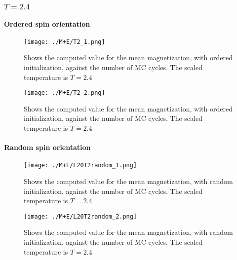 \documentclass[../main.tex]{subfiles}
\begin{document}
\subsubsection*{$T=2.4$}
\paragraph*{Ordered spin orientation}

\begin{figure}[!h]
  \texttt{[image: ./M+E/T2\_1.png]}
  \caption{Shows the computed value for the mean magnetization, with ordered initialization, against the number of MC cycles. The scaled temperature is $T=2.4$}
  \label{fig:results-MCplot}
\end{figure}
\FloatBarrier
\begin{figure}[!h]
  \texttt{[image: ./M+E/T2\_2.png]}
  \caption{Shows the computed value for the mean magnetization, with ordered initialization, against the number of MC cycles. The scaled temperature is $T=2.4$}
  \label{fig:results-MCplot}
\end{figure}
\FloatBarrier

\paragraph*{Random spin orientation}

\begin{figure}[!h]
  \texttt{[image: ./M+E/L20T2random\_1.png]}
  \caption{Shows the computed value for the mean magnetization, with random initialization, against the number of MC cycles. The scaled temperature is $T=2.4$}
  \label{fig:results-MCplot}
\end{figure}
\FloatBarrier
\begin{figure}[!h]
  \texttt{[image: ./M+E/L20T2random\_2.png]}
  \caption{Shows the computed value for the mean magnetization, with random initialization, against the number of MC cycles. The scaled temperature is $T=2.4$}
  \label{fig:results-MCplot}
\end{figure}
\FloatBarrier
\end{document}
